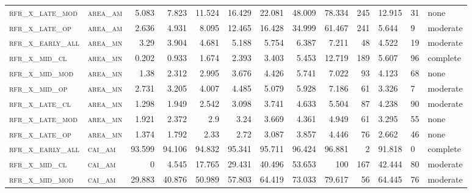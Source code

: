\begin{landscape}
\begin{center}
\begin{footnotesize}
\begin{longtable}{llrrrrr|rrr}
\textsc{rfr\_x\_late\_mod } & \textsc{area\_am  }   & 5.083   & 7.823   & 11.524  & 16.429   & 22.081   & 48.009   & 78.334   & 245    & 12.915        & 31            & none        \\
\textsc{rfr\_x\_late\_op  } & \textsc{area\_am  }   & 2.636   & 4.931   & 8.095   & 12.465   & 16.428   & 34.999   & 61.467   & 241    & 5.644         & 9             & moderate        \\
\textsc{rfr\_x\_early\_all} & \textsc{area\_mn  }   & 3.29    & 3.904   & 4.681   & 5.188    & 5.754    & 6.387    & 7.211    & 48     & 4.522         & 19            & moderate        \\
\textsc{rfr\_x\_mid\_cl   } & \textsc{area\_mn  }   & 0.202   & 0.933   & 1.674   & 2.393    & 3.403    & 5.453    & 12.719   & 189    & 5.607         & 96            & complete        \\
\textsc{rfr\_x\_mid\_mod  } & \textsc{area\_mn  }   & 1.38    & 2.312   & 2.995   & 3.676    & 4.426    & 5.741    & 7.022    & 93     & 4.123         & 68            & none        \\
\textsc{rfr\_x\_mid\_op   } & \textsc{area\_mn  }   & 2.731   & 3.205   & 4.007   & 4.485    & 5.079    & 5.928    & 7.186    & 61     & 3.326         & 7             & moderate        \\
\textsc{rfr\_x\_late\_cl  } & \textsc{area\_mn  }   & 1.298   & 1.949   & 2.542   & 3.098    & 3.741    & 4.633    & 5.504    & 87     & 4.238         & 90            & moderate        \\
\textsc{rfr\_x\_late\_mod } & \textsc{area\_mn  }   & 1.921   & 2.372   & 2.9     & 3.24     & 3.669    & 4.361    & 4.949    & 61     & 3.295         & 55            & none        \\
\textsc{rfr\_x\_late\_op  } & \textsc{area\_mn  }   & 1.374   & 1.792   & 2.33    & 2.72     & 3.087    & 3.857    & 4.446    & 76     & 2.662         & 46            & none        \\
\textsc{rfr\_x\_early\_all} & \textsc{cai\_am   }   & 93.599  & 94.106  & 94.832  & 95.341   & 95.711   & 96.424   & 96.881   & 2      & 91.818        & 0             & complete            \\
\textsc{rfr\_x\_mid\_cl   } & \textsc{cai\_am   }   & 0       & 4.545   & 17.765  & 29.431   & 40.496   & 53.653   & 100      & 167    & 42.444        & 80            & moderate        \\
\textsc{rfr\_x\_mid\_mod  } & \textsc{cai\_am   }   & 29.883  & 40.876  & 50.989  & 57.803   & 64.419   & 73.033   & 79.617   & 56     & 64.445        & 76            & moderate        \\

\end{longtable}
\end{footnotesize}
\end{center}
\end{landscape}
